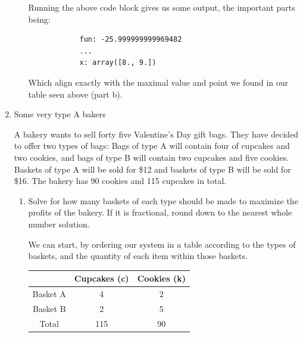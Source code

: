 \documentclass[11pt]{article}
\begin{document}
\begin{enumerate}
\begin{enumerate}
    Running the above code block gives us some output, the important parts
    being:

    \begin{center}
    \begin{verbatim}
            fun: -25.999999999969482
            ...
            x: array([8., 9.])   
    \end{verbatim}
    \end{center}

    Which align exactly with the maximal value and point we found in our table
    seen above (part b).

\end{enumerate}

\newpage


\item Some very type A bakers

    A bakery wants to sell forty five Valentine’s Day gift bags. They have decided to offer two
    types of bags: Bags of type A will contain four of cupcakes and two cookies, and bags of
    type B will contain two cupcakes and five cookies. Baskets of type A will
    be sold for \$12 and baskets of type B will be sold for \$16. The bakery has 
    90 cookies and 115 cupcakes in total.
    
    \begin{enumerate}
        \item Solve for how many baskets of each type should be made to
            maximize the profits of the bakery. If it is fractional, round down
            to the nearest whole number solution.

        We can start, by ordering our system in a table according to the types
        of baskets, and the quantity of each item within those baskets.

        \begin{center}
            \begin{tabular}{|| c || c | c ||}
                \hline
                            & Cupcakes (c)  &   Cookies (k) \\
                \hline \hline
                Basket A    & 4             &   2   \\
                \hline
                Basket B    & 2             &   5   \\
                \hline
                Total       & 115           &   90  \\
                \hline
            \end{tabular}
        \end{center}


\end{enumerate}
\end{enumerate}
\end{document}
